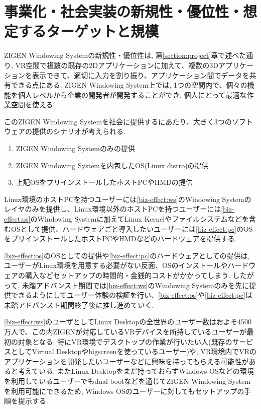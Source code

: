 \section{事業化・社会実装の新規性・優位性・想定するターゲットと規模}
\label{section:biz-effect}


ZIGEN Windowing Systemの新規性・優位性は, 第\ref{section:project}章で述べた通り, VR空間で複数の既存の2Dアプリケーションに加えて、複数の3Dアプリケーションを表示できて、適切に入力を割り振り、アプリケーション間でデータを共有できる点にある.
ZIGEN Windowing System上では, 1つの空間内で、個々の機能を個人レベルから企業の開発者が開発することができ, 個人にとって最適な作業空間を使える.

このZIGEN Windowing Systemを社会に提供するにあたり、大きく3つのソフトウェアの提供のシナリオが考えられる.
\begin{enumerate}[label=(\alph*)]
  \item \label{biz-effect:ws} ZIGEN Windowing Systemのみの提供
  \item \label{biz-effect:os} ZIGEN Windowing Systemを内包したOS(Linux distro)の提供
  \item \label{biz-effect:pc} 上記OSをプリインストールしたホストPCやHMDの提供
\end{enumerate}

Linux環境のホストPCを持つユーザーには\ref{biz-effect:ws}のWindowing Systemのレイヤのみを提供し、Linux環境以外のホストPCを持つユーザーには\ref{biz-effect:os}のWindowing Systemに加えてLinux Kernelやファイルシステムなどを含むOSとして提供、ハードウェアごと導入したいユーザーには\ref{biz-effect:pc}のOSをプリインストールしたホストPCやHMDなどのハードウェアを提供する.

\ref{biz-effect:os}のOSとしての提供や\ref{biz-effect:pc}のハードウェアとしての提供は, ユーザーがLinux環境を用意する必要がない反面、OSのインストールやハードウェアの購入などセットアップの時間的・金銭的コストがかかってしまう.
したがって, 未踏アドバンスト期間では\ref{biz-effect:ws}のWindowing Systemのみを先に提供できるようにしてユーザー体験の検証を行い、\ref{biz-effect:os}や\ref{biz-effect:pc}は未踏アドバンスト期間終了後に推し進めていく.

\ref{biz-effect:ws}のユーザとしてLinux Desktopの全世界のユーザー数はおよそ4500万人で、この内ZIGENが対応しているVRデバイスを所持しているユーザーが最初の対象となる.
特にVR環境でデスクトップの作業が行いたい人(既存のサービスとしてVirtual Desktopやbigscreenを使っているユーザー)や, VR環境内でVRのアプリケーションを開発したいユーザーなどに興味を持ってもらえる可能性があると考えている.
またLinux Desktopをまだ持っておらずWindows OSなどの環境を利用しているユーザーでもdual bootなどを通じてZIGEN Windowing Systemを利用可能にできるため, Windows OSのユーザーに対してもセットアップの手順を提示する.

